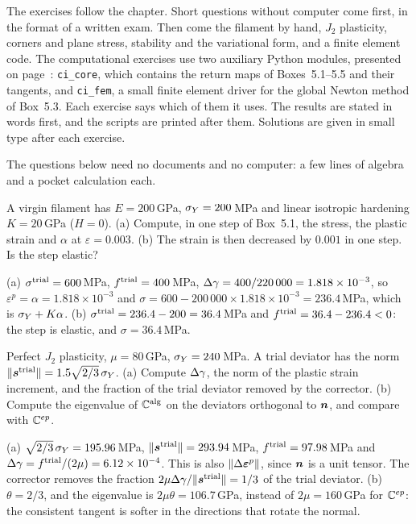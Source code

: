 \label{sec:pn-exo}
The exercises follow the chapter. Short questions without computer come
first, in the format of a written exam. Then come the filament by hand,
$J_2$ plasticity, corners and plane stress, stability and the variational
form, and a finite element code. The computational exercises use two
auxiliary Python modules, presented on page~\pageref{sec:pn-aux}:
\texttt{ci\_core}, which contains the return maps of Boxes~5.1--5.5 and their
tangents, and \texttt{ci\_fem}, a small finite element driver for the global
Newton method of Box~5.3. Each exercise says which of them it uses. The
results are stated in words first, and the scripts are printed after them.
Solutions are given in small type after each exercise.

The questions below need no documents and no computer: a few lines of
algebra and a pocket calculation each.

\label{exo:pn-q-filament}
%
A virgin filament has $E=200$\,GPa, $\sigma_{Y}=200$\,MPa and linear isotropic
hardening $K=20$\,GPa ($H=0$). (a) Compute, in one step of Box~5.1, the
stress, the plastic strain and $\alpha$ at $\varepsilon=0.003$. (b) The
strain is then decreased by $0.001$ in one step. Is the step elastic?
\begin{solution}
(a) $\sigma^{\mathrm{trial}}=600$\,MPa, $f^{\mathrm{trial}}=400$\,MPa,
$\Delta\gamma=400/220\,000=1.818\times10^{-3}$, so
$\varepsilon^p=\alpha=1.818\times10^{-3}$ and
$\sigma=600-200\,000\times1.818\times10^{-3}=236.4$\,MPa, which is
$\sigma_{Y}+K\alpha$. (b) $\sigma^{\mathrm{trial}}=236.4-200=36.4$\,MPa and
$f^{\mathrm{trial}}=36.4-236.4<0$: the step is elastic, and $\sigma=36.4$\,MPa.
\end{solution}

\label{exo:pn-q-radial}
%
Perfect $J_2$ plasticity, $\mu=80$\,GPa, $\sigma_{Y}=240$\,MPa. A trial deviator
has the norm $\lVert \bm{s}^{\mathrm{trial}}\rVert=1.5\sqrt{2/3}\,\sigma_{Y}$. (a) Compute $\Delta\gamma$,
the norm of the plastic strain increment, and the fraction of the trial
deviator removed by the corrector. (b) Compute the eigenvalue of $\mathbb{C}^{\mathrm{alg}}$ on
the deviators orthogonal to $\bm{n}$, and compare with $\mathbb{C}^{ep}$.
\begin{solution}
(a) $\sqrt{2/3}\,\sigma_{Y}=195.96$\,MPa, $\lVert \bm{s}^{\mathrm{trial}}\rVert=293.94$\,MPa,
$f^{\mathrm{trial}}=97.98$\,MPa and $\Delta\gamma=f^{\mathrm{trial}}/(2\mu)=6.12\times10^{-4}$. This is
also $\lVert \Delta\bm{\varepsilon}^{p}\rVert$, since $\bm{n}$ is a unit tensor. The corrector removes
the fraction $2\mu\Delta\gamma/\lVert \bm{s}^{\mathrm{trial}}\rVert=1/3$ of the trial deviator.
(b) $\theta=2/3$, and the eigenvalue is $2\mu\theta=106.7$\,GPa, instead of
$2\mu=160$\,GPa for $\mathbb{C}^{ep}$: the consistent tangent is softer in the
directions that rotate the normal.
\end{solution}

